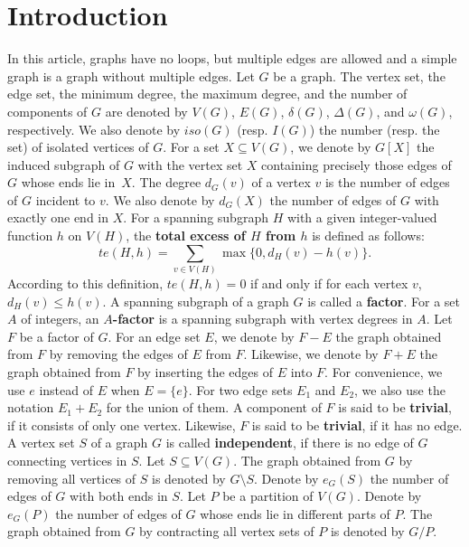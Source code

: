 \documentclass[10pt,bezier]{article}
\begin{document}
\section{Introduction}
In this article, graphs have no loops, but multiple edges are allowed and a simple graph is a graph without multiple edges.
%
%
 Let $G$ be a graph. 
The vertex set, the edge set, the minimum degree, the maximum degree, and the number of components of $G$ are denoted by $V(G)$, $E(G)$, $\delta(G)$, $\Delta(G)$, and $\omega(G)$, respectively. 
%
We also denote by $iso(G)$ (resp. $I(G)$) the number (resp. the set) of isolated vertices of $G$.
For a set $X\subseteq V(G)$, we denote by $G[X]$ the induced subgraph of $G$ with the vertex set $X$ containing
precisely those edges 
of $G$ whose ends lie in~$X$.
The degree $d_G(v)$ of a vertex $v$ is the number of edges of $G$ incident to $v$.
We also denote by $d_G(X)$ the number of edges of $G$ with exactly one end in $X$.
%
For a spanning subgraph $H$ with a given integer-valued function $h$ on $V(H)$,
the {\bf total excess of $H$ from $h$} is defined as follows:
$$te(H, h)=\sum_{v\in V(H)}\max\{0,d_H(v)-h(v)\}.$$
%
According to this definition, $te(H,h)=0$ if and only if for each vertex $v$, $ d_H(v)\le h(v)$.
A spanning subgraph of a graph $G$ is called a {\bf factor}.
For a set $A$ of integers, an {\bf $A$-factor} is a spanning subgraph with vertex degrees in $A$. 
%
Let $F$ be a factor of $G$.
%
For an edge set $E$, we denote by $F-E$ the graph obtained from $F$ by removing the edges of $E$ from $F$.
Likewise, we denote by $F+E$ the graph obtained from $F$ by inserting the edges of $E$ into $F$.
For convenience, we use $e$ instead of $E$ when $E=\{e\}$.
For two edge sets $E_1$ and $E_2$, we also use the notation $E_1+E_2$ for the union of them.
%
% 
A component of $F$ is said to be {\bf trivial}, if it consists of only one vertex.
 Likewise, $F$ is said to be {\bf trivial}, if it has no edge. 
A vertex set $S$ of a graph $G$ is called {\bf independent}, if there is no edge of $G$ connecting vertices in $S$.
%
Let $S\subseteq V(G)$. 
 The graph obtained from $G$ by removing all vertices of $S$ is denoted by $G\setminus S$.
%
Denote by $e_G(S)$ the number of edges of $G$ with both ends in $S$. 
%
%
Let $P$ be a partition of $V(G)$.
Denote by $e_G(P)$ the number of edges of $G$ whose ends lie in different parts of $P$.
%
The graph obtained from $G$ by contracting all vertex sets of $P$ is denoted by $G/P$.
\end{document}
